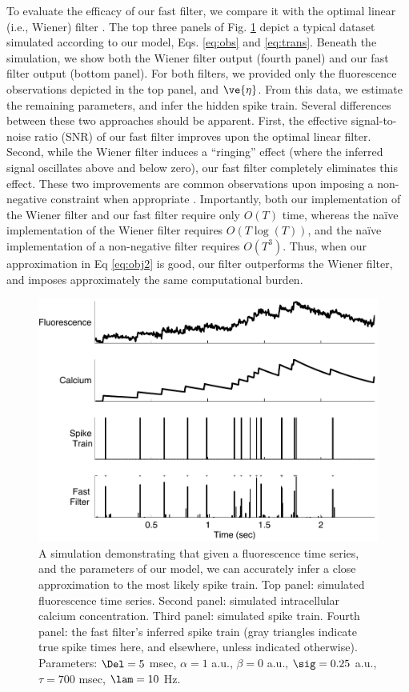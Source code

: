 To evaluate the efficacy of our fast filter, we compare it with the optimal linear (i.e., Wiener) filter \cite{Wiener49}. The top three panels of Fig. \ref{fig:schem} depict a typical dataset simulated according to our model, Eqs. \eqref{eq:obs} and \eqref{eq:trans}. Beneath the simulation, we show both the Wiener filter output (fourth panel) and our fast filter output (bottom panel).  For both filters, we provided only the fluorescence observations depicted in the top panel, and $\ve{\eta}$.  From this data, we estimate the remaining parameters, and infer the hidden spike train. Several differences between these two approaches should be apparent.  First, the effective signal-to-noise ratio (SNR) of our fast filter improves upon the optimal linear filter.  Second, while the Wiener filter induces a ``ringing'' effect (where the inferred signal oscillates above and below zero), our fast filter completely eliminates this effect.  These two improvements are common observations upon imposing a non-negative constraint when appropriate \cite{ShumwayStoffer06}.  Importantly, both our implementation of the Wiener filter and our fast filter require only $O(T)$ time, whereas the na\"{i}ve implementation of the Wiener filter requires $O(T \log(T))$, and the na\"{i}ve implementation of a non-negative filter requires $O(T^3)$.  Thus, when our approximation in Eq \eqref{eq:obj2} is good, our filter outperforms the Wiener filter, and imposes approximately the same computational burden.

\newpage \begin{figure}[H]
\centering \includegraphics[width=.9\linewidth]{../figs/schem}
\caption{A simulation demonstrating that given a fluorescence time series, and the parameters of our model, we can accurately infer a close approximation to the most likely spike train.  Top panel: simulated fluorescence time series.  Second panel: simulated intracellular calcium concentration.  Third panel: simulated spike train. Fourth panel: the fast filter's inferred spike train (gray triangles indicate true spike times here, and elsewhere, unless indicated otherwise).  Parameters: $\Del=5$ msec, $\alpha=1$ a.u., $\beta=0$ a.u., $\sig=0.25$ a.u., $\tau=700$ msec, $\lam=10$ Hz.} \label{fig:schem}
\end{figure}

